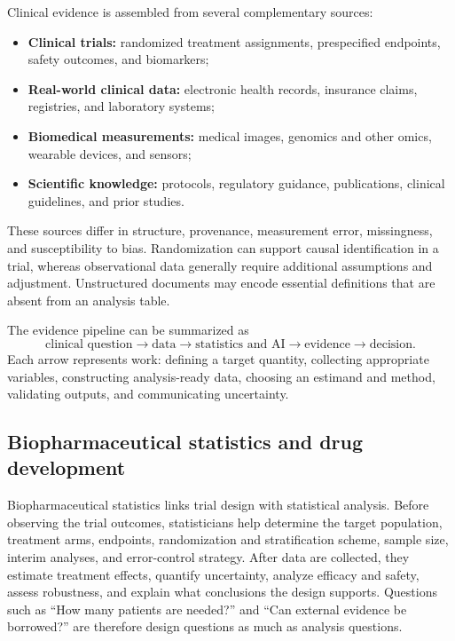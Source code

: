 \documentclass[12pt,oneside]{book}
\numberwithin{equation}{section}
\theoremstyle{definition}
\theoremstyle{plain}
\theoremstyle{remark}
\begin{document}
Clinical evidence is assembled from several complementary sources:
\begin{itemize}
    \item \textbf{Clinical trials:} randomized treatment assignments,
    prespecified endpoints, safety outcomes, and biomarkers;
    \item \textbf{Real-world clinical data:} electronic health records,
    insurance claims, registries, and laboratory systems;
    \item \textbf{Biomedical measurements:} medical images, genomics and other
    omics, wearable devices, and sensors;
    \item \textbf{Scientific knowledge:} protocols, regulatory guidance,
    publications, clinical guidelines, and prior studies.
\end{itemize}
These sources differ in structure, provenance, measurement error, missingness,
and susceptibility to bias.  Randomization can support causal identification in
a trial, whereas observational data generally require additional assumptions
and adjustment.  Unstructured documents may encode essential definitions that
are absent from an analysis table.

The evidence pipeline can be summarized as
\[
 \text{clinical question}
 \longrightarrow \text{data}
 \longrightarrow \text{statistics and AI}
 \longrightarrow \text{evidence}
 \longrightarrow \text{decision}.
\]
Each arrow represents work: defining a target quantity, collecting appropriate
variables, constructing analysis-ready data, choosing an estimand and method,
validating outputs, and communicating uncertainty.

\subsection{Biopharmaceutical statistics and drug development}

Biopharmaceutical statistics links trial design with statistical analysis.
Before observing the trial outcomes, statisticians help determine the target
population, treatment arms, endpoints, randomization and stratification scheme,
sample size, interim analyses, and error-control strategy.  After data are
collected, they estimate treatment effects, quantify uncertainty, analyze
efficacy and safety, assess robustness, and explain what conclusions the design
supports.  Questions such as ``How many patients are needed?'' and ``Can
external evidence be borrowed?'' are therefore design questions as much as
analysis questions.
\end{document}
